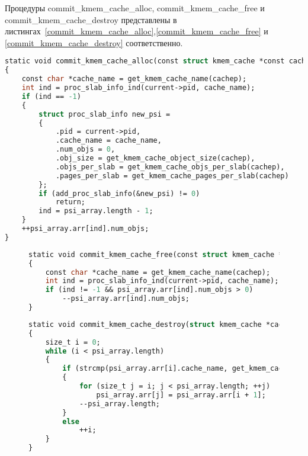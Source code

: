 Процедуры commit\_kmem\_cache\_alloc, commit\_kmem\_cache\_free и commit\_kmem\_cache\-\_destroy представлены в листингах~\ref{commit_kmem_cache_alloc},\ref{commit_kmem_cache_free} и \ref{commit_kmem_cache_destroy} соответственно.
	\begin{lstlisting}[label=commit_kmem_cache_alloc,caption=Процедура commit\_kmem\_cache\_alloc,language=Caml]
static void commit_kmem_cache_alloc(const struct kmem_cache *const cachep)
{
	const char *cache_name = get_kmem_cache_name(cachep);
	int ind = proc_slab_info_ind(current->pid, cache_name);
	if (ind == -1)
	{
		struct proc_slab_info new_psi =
		{
			.pid = current->pid,
			.cache_name = cache_name,
			.num_objs = 0,
			.obj_size = get_kmem_cache_object_size(cachep),
			.objs_per_slab = get_kmem_cache_objs_per_slab(cachep),
			.pages_per_slab = get_kmem_cache_pages_per_slab(cachep)
		};
		if (add_proc_slab_info(&new_psi) != 0)
			return;
		ind = psi_array.length - 1;
	}
	++psi_array.arr[ind].num_objs;
}
	\end{lstlisting}
\begin{figure}[H]
\begin{lstlisting}[label=commit_kmem_cache_free,caption=Процедура commit\_kmem\_cache\_free,language=Caml]
static void commit_kmem_cache_free(const struct kmem_cache *const cachep)
{
	const char *cache_name = get_kmem_cache_name(cachep);
	int ind = proc_slab_info_ind(current->pid, cache_name);
	if (ind != -1 && psi_array.arr[ind].num_objs > 0)
		--psi_array.arr[ind].num_objs;
}
\end{lstlisting}
\end{figure}
\begin{figure}[H]
	\begin{lstlisting}[label=commit_kmem_cache_destroy,caption=Процедура commit\_kmem\_cache\_destroy,language=Caml]
static void commit_kmem_cache_destroy(struct kmem_cache *cachep)
{
	size_t i = 0;
	while (i < psi_array.length)
	{
		if (strcmp(psi_array.arr[i].cache_name, get_kmem_cache_name(cachep)) == 0)
		{
			for (size_t j = i; j < psi_array.length; ++j)
				psi_array.arr[j] = psi_array.arr[i + 1];
			--psi_array.length;
		}
		else
			++i;
	}
}
	\end{lstlisting}
\end{figure}

